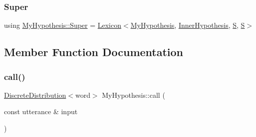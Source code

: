 \mbox{\label{class_my_hypothesis_a266742f266abc638ddc1d1870d735313}} 
\subsubsection{\texorpdfstring{Super}{Super}\hspace{0.1cm}{\footnotesize\ttfamily [5/5]}}
{\footnotesize\ttfamily using \hyperlink{class_my_hypothesis_a266742f266abc638ddc1d1870d735313}{My\+Hypothesis\+::\+Super} =  \hyperlink{class_lexicon}{Lexicon}$<$\hyperlink{class_my_hypothesis}{My\+Hypothesis}, \hyperlink{class_inner_hypothesis}{Inner\+Hypothesis}, \hyperlink{_models_2_formal_language_theory-_complex_2main_8cpp_a51c40915539205f0b5add30b0d68a4cb}{S}, \hyperlink{_models_2_formal_language_theory-_complex_2main_8cpp_a51c40915539205f0b5add30b0d68a4cb}{S}$>$}



\subsection{Member Function Documentation}
\mbox{\label{class_my_hypothesis_a88c6c3c093e040601d7283abf09b6348}} 
\subsubsection{\texorpdfstring{call()}{call()}\hspace{0.1cm}{\footnotesize\ttfamily [1/2]}}
{\footnotesize\ttfamily \hyperlink{class_discrete_distribution}{Discrete\+Distribution}$<$word$>$ My\+Hypothesis\+::call (\begin{DoxyParamCaption}\item[{const utterance \&}]{input }\end{DoxyParamCaption})\hspace{0.3cm}{\ttfamily [inline]}}

\mbox{\label{class_my_hypothesis_a61391d3f1f6fbbe37663b22e2068ac90}} 
